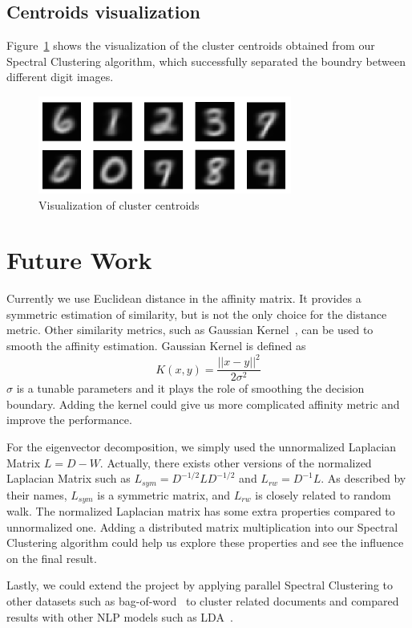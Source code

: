 \documentclass{acm_proc_article-sp}
\begin{document}
\subsection{Centroids visualization}
Figure~\ref{visual_centroids} shows the visualization of the cluster centroids obtained from our Spectral Clustering algorithm, which successfully separated the boundry between different digit images.

\begin{figure}[ht]
\centering
\includegraphics[height=3.2cm]{scdigits.png}
\caption{Visualization of cluster centroids}
\label{visual_centroids}
\end{figure}

\section{Future Work}
Currently we use Euclidean distance in the affinity matrix. It provides a symmetric estimation of similarity, but is not the only choice for the distance metric. Other similarity metrics, such as Gaussian Kernel~\cite{keerthi2003asymptotic}, can be used to smooth the affinity estimation. Gaussian Kernel is defined as $$K(x, y) = \frac{||x - y||^2}{2\sigma^2}$$ $\sigma$ is a tunable parameters and it plays the role of smoothing the decision boundary. Adding the kernel could give us more complicated affinity metric and improve the performance.

For the eigenvector decomposition, we simply used the unnormalized Laplacian Matrix $L = D - W$. Actually, there exists other versions of the normalized Laplacian Matrix such as $L_{sym} = D^{-1/2}LD^{-1/2}$ and $L_{rw} = D^{-1}L$. As described by their names, $L_{sym}$ is a symmetric matrix, and $L_{rw}$ is closely related to random walk. The normalized Laplacian matrix has some extra properties compared to unnormalized one. Adding a distributed matrix multiplication into our Spectral Clustering algorithm could help us explore these properties and see the influence on the final result.

Lastly, we could extend the project by applying parallel Spectral Clustering to other datasets such as bag-of-word~\cite{Lichman:2013} to cluster related documents and compared results with other NLP models such as LDA~\cite{blei 2003 latent}.
\end{document}
